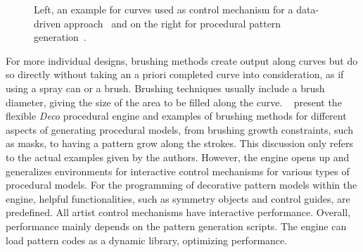 \begin{figure}[t]
    \centering
    \caption{\label{fig:curves} Left, an example for curves used as control mechanism for a data-driven approach~\cite{lu_2014_dds} and on the right for procedural pattern generation~\cite{mech_2012_tdf}.}
\end{figure}

For more individual designs, brushing methods create output along curves but do so directly without taking an a priori completed curve into consideration, as if using a spray can or a brush. Brushing techniques usually include a brush diameter, giving the size of the area to be filled along the curve. \citeauthor*{mech_2012_tdf}~\cite{mech_2012_tdf} present the flexible \textit{Deco} procedural engine and examples of brushing methods for different aspects of generating procedural models, from brushing growth constraints, such as masks, to having a pattern grow along the strokes. This discussion only refers to the actual examples given by the authors. However, the engine opens up and generalizes environments for interactive control mechanisms for various types of procedural models. For the programming of decorative pattern models within the engine, helpful functionalities, such as symmetry objects and control guides, are predefined. All artist control mechanisms have interactive performance. Overall, performance mainly depends on the pattern generation scripts. The engine can load pattern codes as a dynamic library, optimizing performance. 

